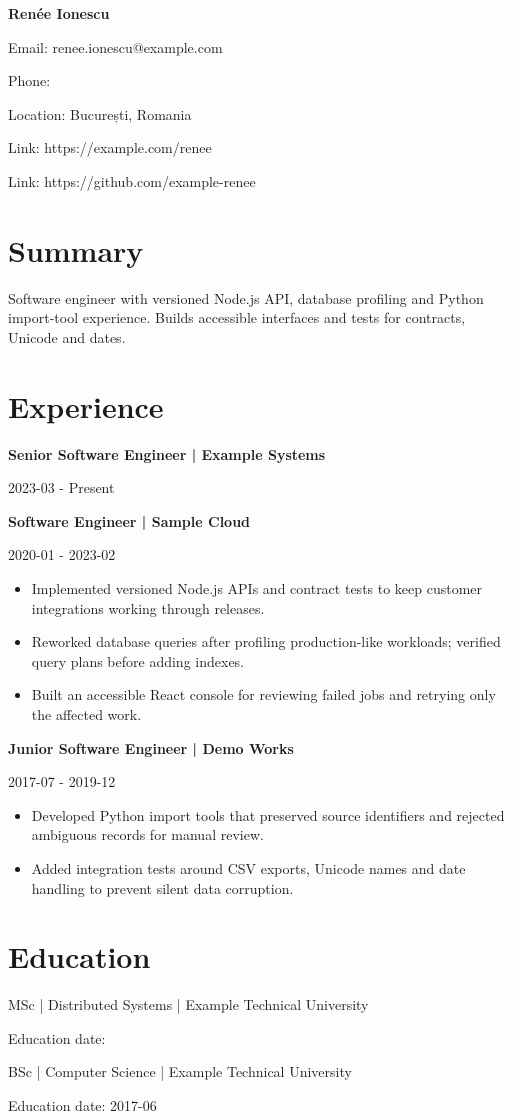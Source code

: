 \documentclass[11pt,a4paper]{article}
\begin{document}
{\LARGE\bfseries Renée Ionescu}\par
\par
Email: renee.ionescu@example.com\par
Phone: \par
Location: București, Romania\par
Link: https://example.com/renee\par
Link: https://github.com/example-renee\par
\section*{Summary}
Software engineer with versioned Node.js API, database profiling and Python import-tool experience. Builds accessible interfaces and tests for contracts, Unicode and dates.
\section*{Experience}
\textbf{Senior Software Engineer | Example Systems}\par
2023-03 - Present\par
{}
\textbf{Software Engineer | Sample Cloud}\par
2020-01 - 2023-02\par
\begin{itemize}
\item Implemented versioned Node.js APIs and contract tests to keep customer integrations working through releases.
\item Reworked database queries after profiling production-like workloads; verified query plans before adding indexes.
\item Built an accessible React console for reviewing failed jobs and retrying only the affected work.
\end{itemize}
\textbf{Junior Software Engineer | Demo Works}\par
2017-07 - 2019-12\par
\begin{itemize}
\item Developed Python import tools that preserved source identifiers and rejected ambiguous records for manual review.
\item Added integration tests around CSV exports, Unicode names and date handling to prevent silent data corruption.
\end{itemize}
\section*{Education}
MSc | Distributed Systems | Example Technical University\par
Education date: \par
BSc | Computer Science | Example Technical University\par
Education date: 2017-06\par
\end{document}
